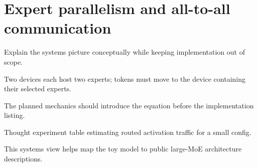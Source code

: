 \section{Expert parallelism and all-to-all communication}
\label{sec:ch12-expert-parallelism-and-all-to-all-communication}

Explain the systems picture conceptually while keeping implementation out of scope.



Two devices each host two experts; tokens must move to the device containing their selected experts.



The planned mechanics should introduce the equation before the implementation listing.





\begin{checkpointbox}
Thought experiment table estimating routed activation traffic for a small config.
\end{checkpointbox}

This systems view helps map the toy model to public large-MoE architecture descriptions.

